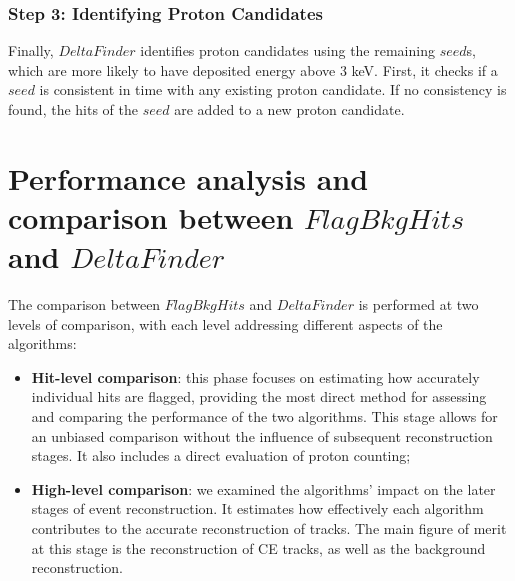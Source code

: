 \subsubsection{Step 3: Identifying Proton Candidates}
Finally, $DeltaFinder$ identifies proton candidates 
using the remaining $seed$s, which are more likely 
to have deposited energy above 3 keV. First, it checks 
if a $seed$ is consistent in time with any existing 
proton candidate. If no consistency is found, 
the hits of the $seed$ are added to a new proton candidate.


\section{Performance analysis and comparison between $FlagBkgHits$ and $DeltaFinder$}
The comparison between $FlagBkgHits$ and $DeltaFinder$ 
is performed at two levels of 
comparison, with each level addressing different aspects 
of the algorithms:

\begin{itemize}
    \item \textbf{Hit-level comparison}: this 
    phase focuses 
    on estimating how accurately individual hits are 
    flagged, providing the most direct method for 
    assessing and comparing the performance of the two 
    algorithms. This stage allows for an unbiased 
    comparison without the influence of subsequent 
    reconstruction stages. It also includes a 
    direct evaluation of proton counting;
    
    \item \textbf{High-level comparison}: we examined  
    the algorithms' impact on the later stages of 
    event reconstruction. It estimates how effectively 
    each algorithm contributes to the accurate reconstruction 
    of tracks. The main figure of merit at this stage is the 
    reconstruction of CE tracks, as well as the background reconstruction.
\end{itemize}

